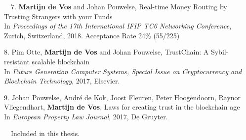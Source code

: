\begin{etaremune}
{\item[\faFileTextO~~7.] \textbf{Martijn de Vos} and Johan Pouwelse, Real-time Money Routing by Trusting Strangers with your Funds\\
In \emph{Proceedings of the 17th International IFIP TC6 Networking Conference}, Zurich, Switzerland, 2018. Acceptance Rate 24\% (55/225)

\item[8.] Pim Otte, \textbf{Martijn de Vos} and Johan Pouwelse, TrustChain: A Sybil-resistant scalable blockchain\\
In \emph{Future Generation Computer Systems, Special Issue on Cryptocurrency and Blockchain Technology}, 2017, Elsevier.

\item[9.] Johan Pouwelse, André de Kok, Joost Fleuren, Peter Hoogendoorn, Raynor Vliegendhart, \textbf{Martijn de Vos}, Laws for creating trust in the blockchain age\\
In \emph{European Property Law Journal}, 2017, De Gruyter.

}\end{etaremune}

\vspace{0.5cm}
\noindent
\faFileTextO~~Included in this thesis.\\
